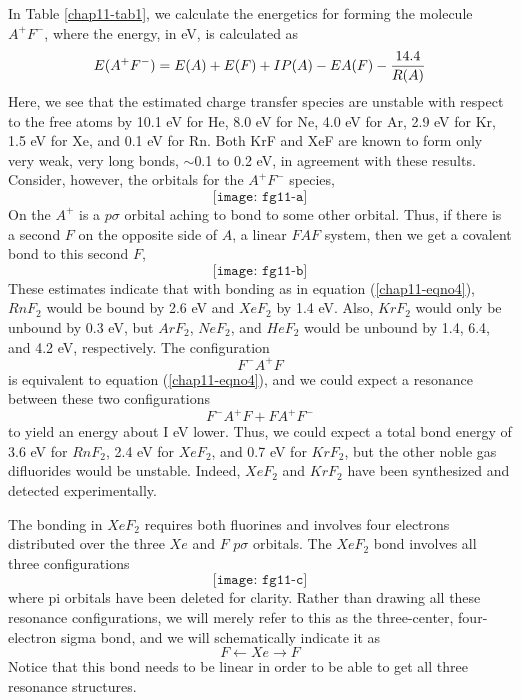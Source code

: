 In Table \ref{chap11-tab1}, we calculate the energetics for forming
the molecule $A^+F^-$, where the energy, in eV, is calculated as
\begin{equation}
E(A^+F^-) = E(A) + E(F) + IP(A) - EA(F) - {14.4 \over R(A)}
\label{chap11-eqno2}
\end{equation}
Here, we see that the estimated charge transfer species are unstable with 
respect to the free atoms by 10.1 eV for He, 8.0 eV for Ne, 4.0 eV for 
Ar, 2.9 eV for Kr, 1.5 eV for Xe, and 0.1 eV for Rn.  Both KrF and XeF 
are known to form only very weak, very long bonds, $\sim$0.1
to 0.2 eV, in agreement with these results.  Consider, however, the 
orbitals for the $A^+F^-$ species,
\begin{equation}
\texttt{[image: fg11-a]}
\label{chap11-eqno3}
\end{equation}
On the $A^+$ is a $p\sigma$ orbital aching to bond to some other 
orbital. Thus, if there is a second $F$ on
the opposite side of $A$, a linear $FAF$ system, then we get a covalent bond 
to this second $F$,
\begin{equation}
\texttt{[image: fg11-b]}
\label{chap11-eqno4}
\end{equation}
These estimates indicate that with bonding as in equation
(\ref{chap11-eqno4}), $RnF_2$ would be bound by 2.6 eV and $XeF_2$ by
1.4 eV.  Also, $KrF_2$ would only be unbound by 0.3 eV, but $ArF_2$,
$NeF_2$, and $HeF_2$ would be unbound by 1.4, 6.4, and 4.2 eV,
respectively. The configuration
\begin{equation}
F^- A^+ F
\end{equation}
is equivalent to equation (\ref{chap11-eqno4}), and we could expect a
resonance between these two configurations
\begin{equation}
F^- A^+ F + FA^+ F^-
\label{chap11-eqno5}
\end{equation}
to yield an energy about I eV lower.  Thus, we could expect a total bond 
energy of 3.6 eV for $RnF_2$, 2.4 eV for $XeF_2$, and 0.7 eV for $KrF_2$, 
but the other noble gas difluorides would be unstable.  Indeed, $XeF_2$ 
and $KrF_2$ have been synthesized and detected experimentally.

The bonding in $XeF_2$ requires both fluorines and involves four electrons 
distributed over the three $Xe$ and $F$ $p \sigma$ orbitals.  The $XeF_2$ 
bond involves all three configurations
\begin{equation}
\texttt{[image: fg11-c]}
\label{chap11-eqno6}
\end{equation}
where pi orbitals have been deleted for clarity.  Rather than drawing all 
these resonance configurations, we will merely refer to this as the three-center, 
four-electron sigma bond, and we will schematically indicate it as
\begin{equation}
F \longleftarrow Xe	\longrightarrow F
\end{equation}
Notice that this bond needs to be linear in order to be able to get all 
three resonance structures.

